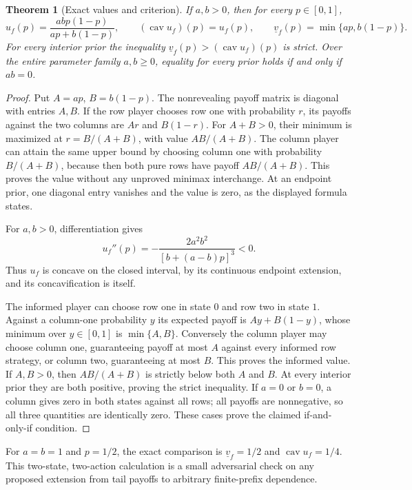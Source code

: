 \documentclass[11pt]{article}
\newtheorem{theorem}{Theorem}
\theoremstyle{definition}
\DeclareMathOperator{\cav}{cav}
\begin{document}
\begin{theorem}[Exact values and criterion]
If $a,b>0$, then for every $p\in[0,1]$,
\[
 u_f(p)=\frac{abp(1-p)}{ap+b(1-p)},\qquad
 (\cav u_f)(p)=u_f(p),\qquad
 \underline v_f(p)=\min\{ap,b(1-p)\}.
\]
For every interior prior the inequality $\underline v_f(p)>(\cav u_f)(p)$ is strict. Over the entire parameter family $a,b\ge0$, equality for every prior holds if and only if $ab=0$.
\end{theorem}
\begin{proof}
Put $A=ap$, $B=b(1-p)$. The nonrevealing payoff matrix is diagonal with entries $A,B$. If the row player chooses row one with probability $r$, its payoffs against the two columns are $Ar$ and $B(1-r)$. For $A+B>0$, their minimum is maximized at $r=B/(A+B)$, with value $AB/(A+B)$. The column player can attain the same upper bound by choosing column one with probability $B/(A+B)$, because then both pure rows have payoff $AB/(A+B)$. This proves the value without any unproved minimax interchange. At an endpoint prior, one diagonal entry vanishes and the value is zero, as the displayed formula states.

For $a,b>0$, differentiation gives
\[
 u_f''(p)=-\frac{2a^2b^2}{[b+(a-b)p]^3}<0.
\]
Thus $u_f$ is concave on the closed interval, by its continuous endpoint extension, and its concavification is itself.

The informed player can choose row one in state $0$ and row two in state $1$. Against a column-one probability $y$ its expected payoff is $Ay+B(1-y)$, whose minimum over $y\in[0,1]$ is $\min\{A,B\}$. Conversely the column player may choose column one, guaranteeing payoff at most $A$ against every informed row strategy, or column two, guaranteeing at most $B$. This proves the informed value. If $A,B>0$, then $AB/(A+B)$ is strictly below both $A$ and $B$. At every interior prior they are both positive, proving the strict inequality. If $a=0$ or $b=0$, a column gives zero in both states against all rows; all payoffs are nonnegative, so all three quantities are identically zero. These cases prove the claimed if-and-only-if condition.
\end{proof}

For $a=b=1$ and $p=1/2$, the exact comparison is $\underline v_f=1/2$ and $\cav u_f=1/4$. This two-state, two-action calculation is a small adversarial check on any proposed extension from tail payoffs to arbitrary finite-prefix dependence.
\end{document}
